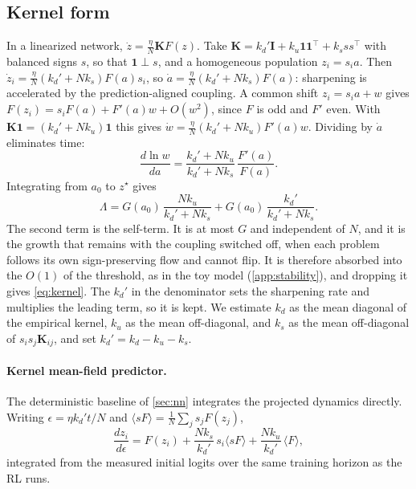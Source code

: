 \subsection{Kernel form}
\label{app:kernel}
In a linearized network, $\dot z=\frac\eta N\mathbf K F(z)$.
Take $\mathbf K=k_d'\mathbf I+k_u\mathbf1\mathbf1^\top+k_sss^\top$ with balanced signs $s$, so that $\mathbf1\perp s$, and a homogeneous population $z_i=s_ia$.
Then $\dot z_i=\frac\eta N(k_d'+Nk_s)F(a)s_i$, so $\dot a=\frac\eta N(k_d'+Nk_s)F(a)$: sharpening is accelerated by the prediction-aligned coupling.
A common shift $z_i=s_ia+w$ gives $F(z_i)=s_iF(a)+F'(a)w+O(w^2)$, since $F$ is odd and $F'$ even. With $\mathbf K\mathbf1=(k_d'+Nk_u)\mathbf1$ this gives $\dot w=\frac\eta N(k_d'+Nk_u)F'(a)w$.
Dividing by $\dot a$ eliminates time:
\begin{equation*}
  \frac{d\ln w}{da}=\frac{k_d'+Nk_u}{k_d'+Nk_s}\,\frac{F'(a)}{F(a)}.
\end{equation*}
Integrating from $a_0$ to $z^\star$ gives
\begin{equation*}
  \Lambda=G(a_0)\,\frac{Nk_u}{k_d'+Nk_s}+G(a_0)\,\frac{k_d'}{k_d'+Nk_s}.
\end{equation*}
The second term is the self-term. It is at most $G$ and independent of $N$, and it is the growth that remains with the coupling switched off, when each problem follows its own sign-preserving flow and cannot flip. It is therefore absorbed into the $O(1)$ of the threshold, as in the toy model (\cref{app:stability}), and dropping it gives \cref{eq:kernel}. The $k_d'$ in the denominator sets the sharpening rate and multiplies the leading term, so it is kept.
We estimate $k_d$ as the mean diagonal of the empirical kernel, $k_u$ as the mean off-diagonal, and $k_s$ as the mean off-diagonal of $s_is_j\mathbf K_{ij}$, and set $k_d'=k_d-k_u-k_s$.

\paragraph{Kernel mean-field predictor.}
The deterministic baseline of \cref{sec:nn} integrates the projected dynamics directly. Writing $\epsilon=\eta k_d't/N$ and $\langle sF\rangle=\frac1N\sum_js_jF(z_j)$,
\begin{equation*}
  \frac{dz_i}{d\epsilon}=F(z_i)+\frac{Nk_s}{k_d'}\,s_i\langle sF\rangle+\frac{Nk_u}{k_d'}\,\langle F\rangle,
\end{equation*}
integrated from the measured initial logits over the same training horizon as the RL runs.


